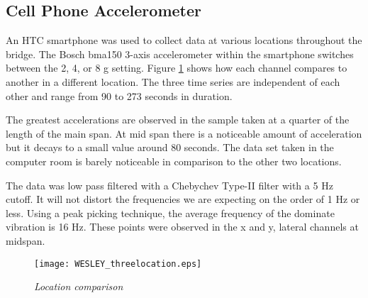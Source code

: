 \subsection{Cell Phone Accelerometer}

An HTC smartphone was used to collect data at various locations throughout the bridge. The Bosch bma150 3-axis accelerometer within the smartphone switches between the 2, 4, or 8 g setting. Figure \ref{fig:threeloc} shows how each channel compares to another in a different location. The three time series are independent of each other and range from 90 to 273 seconds in duration. 

\indent The greatest accelerations are observed in the sample taken at a quarter of the length of the main span. At mid span there is a noticeable amount of acceleration but it decays to a small value around 80 seconds. The data set taken in the computer room is barely noticeable in comparison to the other two locations.

\indent The data was low pass filtered with a Chebychev Type-II filter with a 5 Hz cutoff. It will not distort the frequencies we are expecting on the order of 1 Hz or less. Using a peak picking technique, the average frequency of the dominate vibration is 16 Hz. These points were observed in the x and y, lateral channels at midspan. 

\begin{figure}
\centering
\texttt{[image: WESLEY\_threelocation.eps]}
\caption{\textit{Location comparison}}
\label{fig:threeloc}
\end{figure}
